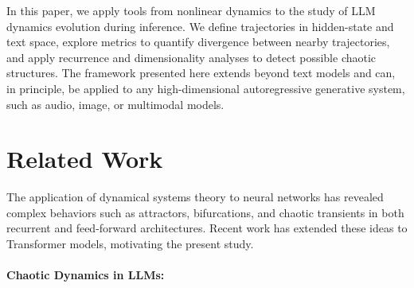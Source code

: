 \documentclass[a4paper,12pt]{article}
\begin{document}
In this paper, we apply tools from nonlinear dynamics to the study of LLM dynamics evolution during inference. We define trajectories in hidden-state and text space, explore metrics to quantify divergence between nearby trajectories, and apply recurrence and dimensionality analyses to detect possible chaotic structures. The framework presented here extends beyond text models and can, in principle, be applied to any high-dimensional autoregressive generative system, such as audio, image, or multimodal models.


\section{Related Work} 
\label{sec:related_work}

The application of dynamical systems theory to neural networks has revealed complex behaviors such as attractors, bifurcations, and chaotic transients in both recurrent and feed-forward architectures. Recent work has extended these ideas to Transformer models, motivating the present study.

\paragraph{Chaotic Dynamics in LLMs:}
\end{document}
